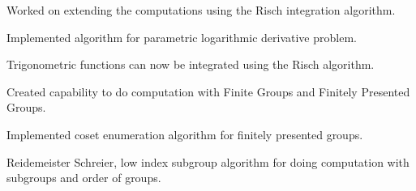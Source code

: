 \documentclass[]{deedy-resume-openfont}
\begin{document}
\begin{minipage}[t]{0.66\textwidth}
\vspace{\topsep} %
\begin{tightemize}
\item Worked on extending the computations using the Risch integration algorithm.
\item Implemented algorithm for parametric logarithmic derivative problem.
\item Trigonometric functions can now be integrated using the Risch algorithm.
\end{tightemize}
\sectionsep

\vspace{\topsep} %
\begin{tightemize}
\item Created capability to do computation with Finite Groups and Finitely Presented Groups.
\item Implemented coset enumeration algorithm for finitely presented groups.
\item Reidemeister Schreier, low index subgroup algorithm for doing computation with subgroups and order of groups.
\end{tightemize}
\sectionsep




\end{minipage}
\end{document}
